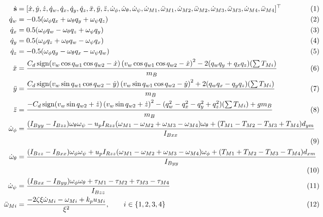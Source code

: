 \documentclass[pdflatex,sn-basic]{sn-jnl}%
\begin{document}
    \begingroup
    \small
    \setlength{\jot}{4pt}
    \begin{subequations}\label{eq:state_space}
    \makebox[\textwidth][c]{%
        \begin{minipage}{1.3\textwidth}
            \begin{align}
                \dot{\mathbf{s}} &= [
                \dot{x},\dot{y},\dot{z},\dot{q}_w,\dot{q}_x,\dot{q}_y,\dot{q}_z,
                \ddot{x},\ddot{y},\ddot{z},
                \dot{\omega}_{\phi},\dot{\omega}_{\theta},\dot{\omega}_{\psi},
                \dot{\omega}_{M1},\ddot{\omega}_{M1},
                \dot{\omega}_{M2},\ddot{\omega}_{M2},
                \dot{\omega}_{M3},\ddot{\omega}_{M3},
                \dot{\omega}_{M4},\ddot{\omega}_{M4}]^{\top}
                \label{eq:state_space_a} \\
                \dot{q}_w &= -0.5(\omega_\phi q_x + \omega_\theta q_y + \omega_\psi q_z) \\
                \dot{q}_x &= 0.5(\omega_\phi q_w - \omega_\theta q_z + \omega_\psi q_y) \\
                \dot{q}_y &= 0.5(\omega_\phi q_z + \omega_\theta q_w - \omega_\psi q_x) \\
                \dot{q}_z &= -0.5(\omega_\phi q_y - \omega_\theta q_x - \omega_\psi q_w)
                \label{eq:state_space_b} \\
                \ddot{x} &= \dfrac{C_d \, \mathrm{sign}(v_w \cos q_{w1} \cos q_{w2} - \dot{x})\left(v_w \cos q_{w1} \cos q_{w2} - \dot{x}\right)^2 - 2(q_w q_y + q_x q_z)(\sum T_{Mi})}{m_B} \\
                \ddot{y} &= \dfrac{C_d \, \mathrm{sign}(v_w \sin q_{w1} \cos q_{w2} - \dot{y})\left(v_w \sin q_{w1} \cos q_{w2} - \dot{y}\right)^2 + 2(q_w q_x - q_y q_z)(\sum T_{Mi})}{m_B} \\
                \ddot{z} &= \dfrac{- C_d \, \mathrm{sign}(v_w \sin q_{w2} + \dot{z})\left(v_w \sin q_{w2} + \dot{z}\right)^2 - (q_w^2 - q_x^2 - q_y^2 + q_z^2)(\sum T_{Mi}) + g m_B}{m_B}
                \label{eq:state_space_c} \\
                \dot{\omega}_{\phi} &= \dfrac{(I_{Byy} - I_{Bzz})\omega_\theta \omega_\psi - u_p I_{Rzz}(\omega_{M1} - \omega_{M2} + \omega_{M3} - \omega_{M4})\omega_\theta + (T_{M1} - T_{M2} - T_{M3} + T_{M4})d_{ym}}{I_{Bxx}} \\
                \dot{\omega}_{\theta} &= \dfrac{(I_{Bzz} - I_{Bxx})\omega_\phi \omega_\psi + u_p I_{Rzz}(\omega_{M1} - \omega_{M2} + \omega_{M3} - \omega_{M4})\omega_\phi + (T_{M1} + T_{M2} - T_{M3} - T_{M4})d_{xm}}{I_{Byy}} \\
                \dot{\omega}_{\psi} &= \dfrac{(I_{Bxx} - I_{Byy})\omega_\phi \omega_\theta + \tau_{M1} - \tau_{M2} + \tau_{M3} - \tau_{M4}}{I_{Bzz}}
                \label{eq:state_space_d} \\
                \ddot{\omega}_{Mi} &= \dfrac{-2\zeta\xi\dot{\omega}_{Mi} - \omega_{Mi} + k_p u_{Mi}}{\xi^2}, \qquad i\in\{1,2,3,4\}
            \label{eq:state_space_e}
            \end{align}
        \end{minipage}%
    }
    \end{subequations}
    \endgroup
\end{document}
